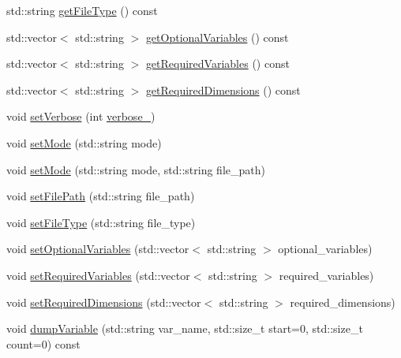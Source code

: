 \begin{DoxyCompactItemize}
std\+::string \mbox{\hyperlink{class_an_en_i_o_a6f51b190d64895a4ad907abcf4a10b75}{get\+File\+Type}} () const
\item 
std\+::vector$<$ std\+::string $>$ \mbox{\hyperlink{class_an_en_i_o_a50997e1baef5b8bb18d833c8c875a7bc}{get\+Optional\+Variables}} () const
\item 
std\+::vector$<$ std\+::string $>$ \mbox{\hyperlink{class_an_en_i_o_abd3cbf0e384dd9d610f985fb4131df9b}{get\+Required\+Variables}} () const
\item 
std\+::vector$<$ std\+::string $>$ \mbox{\hyperlink{class_an_en_i_o_a80e8d2bc7f90b24b93c560a24aeb126e}{get\+Required\+Dimensions}} () const
\item 
void \mbox{\hyperlink{class_an_en_i_o_a696dff7bb250fc45b597e5f82e33e23e}{set\+Verbose}} (int \mbox{\hyperlink{class_an_en_i_o_a4f6abd007730e4a8f54d57cc3572bd9e}{verbose\+\_\+}})
\item 
void \mbox{\hyperlink{class_an_en_i_o_a0f3889bc1652077a4b41016393f0b7c6}{set\+Mode}} (std\+::string mode)
\item 
void \mbox{\hyperlink{class_an_en_i_o_aa199cf152c5c165e9c98d237830ba9ec}{set\+Mode}} (std\+::string mode, std\+::string file\+\_\+path)
\item 
void \mbox{\hyperlink{class_an_en_i_o_a98066d375cc78694fda2af1ce37cc8d8}{set\+File\+Path}} (std\+::string file\+\_\+path)
\item 
void \mbox{\hyperlink{class_an_en_i_o_a00fce5619b087353debcb2a602007f31}{set\+File\+Type}} (std\+::string file\+\_\+type)
\item 
void \mbox{\hyperlink{class_an_en_i_o_abc499df15eac5fa3f203267723f5edfa}{set\+Optional\+Variables}} (std\+::vector$<$ std\+::string $>$ optional\+\_\+variables)
\item 
void \mbox{\hyperlink{class_an_en_i_o_a643c51c346118d8416fa2c2e0da8042a}{set\+Required\+Variables}} (std\+::vector$<$ std\+::string $>$ required\+\_\+variables)
\item 
void \mbox{\hyperlink{class_an_en_i_o_a239ea94b3648006920bcdcded4040ad3}{set\+Required\+Dimensions}} (std\+::vector$<$ std\+::string $>$ required\+\_\+dimensions)
\item 
void \mbox{\hyperlink{class_an_en_i_o_acd5682e81361d75ff5566ae1df5fa023}{dump\+Variable}} (std\+::string var\+\_\+name, std\+::size\+\_\+t start=0, std\+::size\+\_\+t count=0) const
\end{DoxyCompactItemize}
